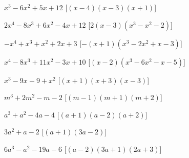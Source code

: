 \begin{esercizio}
\begin{enumeratea}
\item \(x^{3} - 6 x^{2} + 5 x + 12\)
  \hfill [\(\left(x - 4\right) \left(x - 3\right) \left(x + 1\right)\)]
\item \(2 x^{4} - 8 x^{3} + 6 x^{2} - 4 x + 12\)
  \hfill [\(2 \left(x - 3\right) \left(x^{3} - x^{2} - 2\right)\)]
\item \(- x^{4} + x^{3} + x^{2} + 2 x + 3\)
  \hfill [\(- \left(x + 1\right) \left(x^{3} - 2 x^{2} + x - 3\right)\)]
\item \(x^{4} - 8 x^{3} + 11 x^{2} - 3 x + 10\)
  \hfill [\(\left(x - 2\right) \left(x^{3} - 6 x^{2} - x - 5\right)\)]
% 
 \item \(x^{3}-9x-9+x^{2}\)
  \hfill [\((x+1)(x+3)\left(x-3\right)\)]
\item \(m^{3}+2m^{2}-m-2\)
  \hfill [\((m-1)(m+1)\left(m+2\right)\)]
\item \(a^{3}+a^{2}-4a-4\)
  \hfill [\((a+1)(a-2)\left(a+2\right)\)]
\item \(3a^{2}+a-2\)
  \hfill [\((a+1)\left(3a-2\right)\)]
\item \(6a^{3}-a^{2}-19a-6\)
  \hfill [\((a-2)(3a+1)\left(2a+3\right)\)]
 \end{enumeratea}
\end{esercizio}

